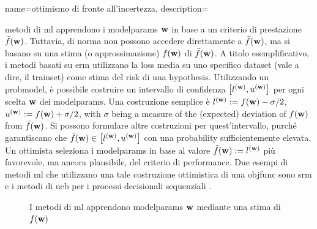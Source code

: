 {name={ottimismo di fronte all’incertezza},
	description={\I metodi di \gls{ml} apprendono i  \glspl{modelparam} ${\bf w}$ 
		in base a un criterio di prestazione $\bar{f}({\bf w})$. Tuttavia, di norma non possono accedere 
		direttamente a $\bar{f}({\bf w})$, ma si basano su una stima (o approssimazione) $f({\bf w})$ di $\bar{f}({\bf w})$. 
		A titolo esemplificativo, i metodi basati su \gls{erm} utilizzano la \gls{loss} media su uno specifico 
		\gls{dataset} (vale a dire, il \gls{trainset}) come stima del \gls{risk} di una \gls{hypothesis}.		
		Utilizzando un \gls{probmodel}, è possibile costruire un intervallo di confidenza
		$\big[ l^{({\bf w})},  u^{({\bf w})} \big]$ per ogni scelta ${\bf w}$ dei \glspl{modelparam}. 
		Una costruzione semplice è $l^{({\bf w})} := f({\bf w}) - \sigma/2$, $u^{({\bf w})} := f({\bf w})+ \sigma/2$, 
	    	with $\sigma$ being a measure of the (expected) deviation of $f({\bf w})$ from $\bar{f}({\bf w})$.
		Si possono formulare altre costruzioni per quest'intervallo, purché garantiscano che 
		$\bar{f}({\bf w}) \in\big[ l^{({\bf w})},  u^{({\bf w})} \big]$ 
		con una \gls{probability} sufficientemente elevata. Un ottimista seleziona i \glspl{modelparam} in base al valore
		 $\tilde{f}({\bf w}) :=  l^{({\bf w})}$ più favorevole, ma ancora plausibile,
		del criterio di performance. Due esempi di metodi \gls{ml} che utilizzano una tale costruzione ottimistica 
		di una \gls{objfunc} sono \gls{srm} \cite[Ch. 11]{ShalevMLBook} e i metodi di \gls{ucb}  
		per i processi decisionali sequenziali \cite[Sec. 2.2]{Bubeck2012}. 
		\begin{figure}[H]
				\begin{center}
\caption{I metodi di \gls{ml} apprendono \glspl{modelparam} ${\bf w}$ mediante una stima di $f({\bf w})$  
}
\end{center}
\end{figure}}}
